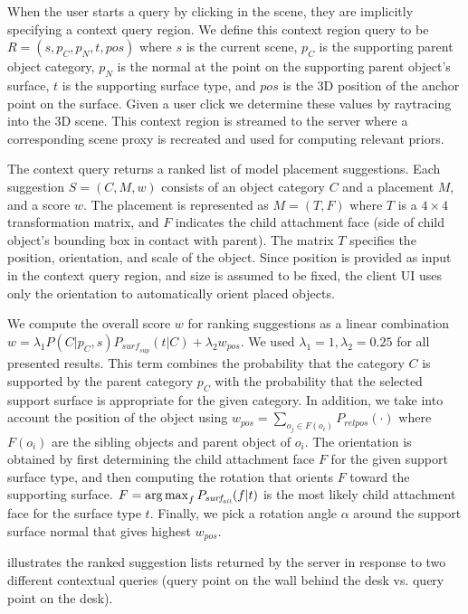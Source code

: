 \documentclass{sigchi}
\begin{document}
When the user starts a query by clicking in the scene, they are implicitly specifying a context query region.  We define this context region query to be $R = (s, p_C, p_N, t, pos)$ where $s$ is the current scene, $p_C$ is the supporting parent object category, $p_N$ is the normal at the point on the supporting parent object's surface, $t$ is the supporting surface type, and $pos$ is the 3D position of the anchor point on the surface.  Given a user click we determine these values by raytracing into the 3D scene.  This context region is streamed to the server where a corresponding scene proxy is recreated and used for computing relevant priors.

The context query returns a ranked list of model placement suggestions.  Each suggestion $S = (C,M,w)$ consists of an object category $C$ and a placement $M$, and a score $w$.  The placement is represented as $M = (T,F)$ where $T$ is a $4\times4$ transformation matrix, and $F$ indicates the child attachment face (side of child object's bounding box in contact with parent).  The matrix $T$ specifies the position, orientation, and scale of the object.  Since position is provided as input in the context query region, and size is assumed to be fixed, the client UI uses only the orientation to automatically orient placed objects.

We compute the overall score $w$ for ranking suggestions as a linear combination $w = \lambda_1 P(C | p_C,s) P_{\textit{surf}_\textit{sup}} (t | C) + \lambda_2 w_\textit{pos}$. We used $\lambda_1=1, \lambda_2=0.25$ for all presented results.  This term combines the probability that the category $C$ is supported by the parent category $p_C$ with the probability that the selected support surface is appropriate for the given category.  In addition, we take into account the position of the object using $w_\textit{pos} = \sum_{o_j \in F(o_i) }P_\textit{relpos}(\cdot)$ where $F(o_i)$ are the sibling objects and parent object of $o_i$.  The orientation is obtained by first determining the child attachment face $F$ for the given support surface type, and then computing the rotation that orients $F$ toward the supporting surface.  $F = \operatorname*{arg\,max}_{f} P_{\textit{surf}_\textit{att}}(f | t)$ is the most likely child attachment face for the surface type $t$.  Finally, we pick a rotation angle $\alpha$ around the support surface normal that gives highest $w_\textit{pos}$.

 illustrates the ranked suggestion lists returned by the server in response to two different contextual queries (query point on the wall behind the desk vs. query point on the desk).
\end{document}
